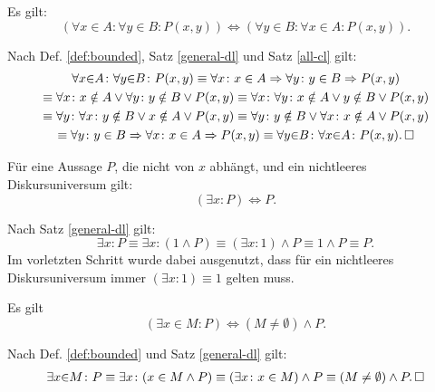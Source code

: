 \begin{Satz}\label{bounded-all-cl}
Es gilt:
\[(\forall x{\in}A\colon \forall y{\in}B\colon P(x,y))
\iff (\forall y{\in}B\colon \forall x{\in}A\colon P(x,y)).\]
\end{Satz}
\begin{Beweis}\newlinefirst
Nach Def. \ref{def:bounded}, Satz \ref{general-dl} und
Satz \ref{all-cl} gilt:
\begin{gather*}
\forall x{\in}A\colon \forall y{\in}B\colon P(x,y)
\equiv \forall x\colon x\in A\Rightarrow \forall y\colon y\in B\Rightarrow P(x,y)\\
\equiv \forall x\colon x\notin A\lor \forall y\colon y\notin B\lor P(x,y)
\equiv \forall x\colon \forall y\colon x\notin A\lor y\notin B\lor P(x,y)\\
\equiv \forall y\colon \forall x\colon y\notin B\lor x\notin A\lor P(x,y)
\equiv \forall y\colon y\notin B\lor \forall x\colon x\notin A\lor P(x,y)\\
\equiv \forall y\colon y\in B\Rightarrow \forall x\colon x\in A\Rightarrow P(x,y)
\equiv \forall y{\in}B\colon\forall x{\in}A\colon P(x,y).\,\square
\end{gather*}
\end{Beweis}

\begin{Satz}
Für eine Aussage $P$, die nicht von $x$ abhängt, und ein nichtleeres
Diskursuniversum gilt:
\[(\exists x\colon P) \iff P.\]
\end{Satz}
\begin{Beweis}[Beweis]
Nach Satz \ref{general-dl} gilt:
\[\exists x\colon P \equiv \exists x\colon (1\land P)
\equiv (\exists x\colon 1)\land P\equiv 1\land P\equiv P.\]
Im vorletzten Schritt wurde dabei ausgenutzt, dass
für ein nichtleeres Diskursuniversum immer $(\exists x\colon 1)\equiv 1$
gelten muss.\,\qedsymbol
\end{Beweis}

\begin{Satz}
Es gilt
\[(\exists x{\in}M\colon P) \iff (M\ne\emptyset)\land P.\]
\end{Satz}

\begin{Beweis}
Nach Def. \ref{def:bounded} und Satz \ref{general-dl} gilt:
\begin{gather*}
\exists x{\in}M\colon P \equiv \exists x\colon (x\in M\land P)
\equiv (\exists x\colon x\in M)\land P\equiv (M\ne\emptyset)\land P.\,\square
\end{gather*}
\end{Beweis}

